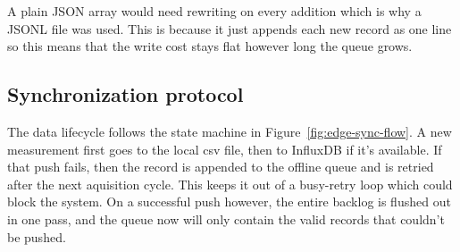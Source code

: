 A plain JSON array would need rewriting on every addition which is why a JSONL file was used. This is because it just appends each new record as one line so this means that the write cost stays flat however long the queue grows.

\subsection{Synchronization protocol}

The data lifecycle follows the state machine in Figure~\ref{fig:edge-sync-flow}. A new measurement first goes to the local csv file, then to InfluxDB if it's available. If that push fails, then the record is appended to the offline queue and is retried after the next aquisition cycle. This keeps it out of a busy-retry loop which could block the system. On a successful push however, the entire backlog is flushed out in one pass, and the queue now will only contain the valid records that couldn't be pushed.

